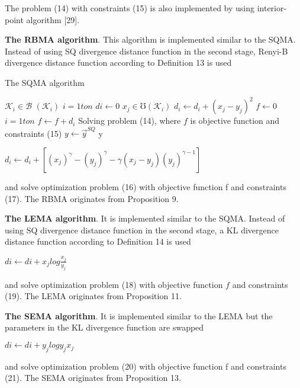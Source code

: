 \documentclass[]{iosart2c}
\begin{document}
  The problem (14) with constraints (15) is also
  implemented by using interior-point algorithm [29].

  \textbf{The RBMA algorithm}. This algorithm is implemented
  similar to the SQMA. Instead of using SQ
  divergence distance function in the second stage,
  Renyi-B divergence distance function according to
  Definition 13 is used

  \begin{algorithm}
    \caption{The SQMA algorithm}
    \begin{algorithmic}[1]
      \For
        $\mathcal{K}_i \in \mathcal{B}$
        \State $(\mathcal{K}_i )$
      \EndFor
      \For
        $i=1 to n$
        \State $di \gets 0$
        \For
          $x_j \in \mho(\mathcal{K}_i)$
          \State $d_i \gets d_i + (x_j - y_j)^2$
        \EndFor
      \EndFor
      \State $f \gets 0$
      \For
        $i=1 to n$
        \State $f \gets f + d_i$
      \EndFor
      \State Solving problem (14), where $f$ is objective function and
      constraints (15)
      \State $y \gets \vec{y}^{SQ}$
      \State \Return y
    \end{algorithmic}
  \end{algorithm}

  $d_i \gets d_i + \left[ (x_j)^\gamma - (y_j)^\gamma - \gamma(x_j - y_j)(y_j)^{\gamma-1} \right]$

  and solve optimization problem (16) with objective function f and constraints (17). The RBMA originates from Proposition
  9.

  \textbf{The LEMA algorithm}. It is implemented similar
  to the SQMA. Instead of using SQ divergence distance
  function in the second stage, a KL divergence
  distance function according to Definition 14 is used

  $di \gets di + x_j log{\frac{x_j}{y_j}}$

  and solve optimization problem (18) with objective function $f$ and constraints (19). The LEMA originates from Proposition 11.

  \textbf{The SEMA algorithm}. It is implemented similar to the LEMA but the parameters in the KL divergence function are swapped

  $di \gets di + y_j log{{y_j}{x_j}}$

  and solve optimization problem (20) with objective function f and constraints (21). The SEMA originates from Proposition 13.
\end{document}
